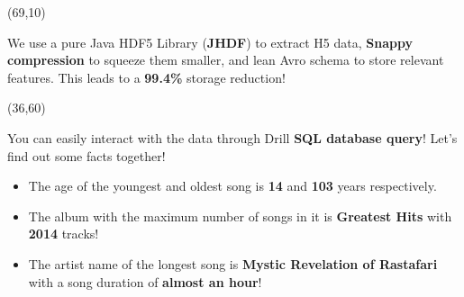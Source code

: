 \documentclass{beamer}
\begin{document}
\begin{frame}

\begin{textblock}{28.5}(69,10)
	\begin{basebox}[
        decadebox,
        title=Data Processing,
        halign title=right
    ]
		We use a pure Java HDF5 Library (\textbf{JHDF}) to extract H5 data, \textbf{Snappy compression} to squeeze them smaller, and lean Avro schema to store relevant features. This leads to a \textbf{99.4\%} storage reduction!
	\end{basebox}
\end{textblock}

\begin{textblock}{28.5}(36,60)
	\begin{basebox}[
        decadebox,
        title=Drill Queries,
        halign title=right
    ]
		You can easily interact with the data through Drill \textbf{SQL database query}! Let's find out some facts together!

        \begin{itemize}
            \item The age of the youngest and oldest song is \textbf{14} and \textbf{103} years respectively.
            \item The album with the maximum number of songs in it is \textbf{Greatest Hits} with \textbf{2014} tracks!
            \item The artist name of the longest song is \textbf{Mystic Revelation of Rastafari} with a song duration of \textbf{almost an hour}!
        \end{itemize}
	\end{basebox}
\end{textblock}



\end{frame}
\end{document}

